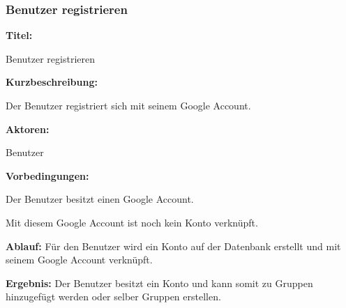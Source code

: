 \documentclass{scrartcl}
\begin{document}
	\subsubsection{Benutzer registrieren}
	\begin{description}
		\item \textbf{Titel:}
		\begin{description}
			\item Benutzer registrieren
		\end{description}
		\item \textbf{Kurzbeschreibung:}
		\begin{description}
			\item Der Benutzer registriert sich mit seinem Google Account.
		\end{description}
		\item \textbf{Aktoren:}
		\begin{description}
			\item Benutzer 
		\end{description}
		\item \textbf{Vorbedingungen:}
		\begin{description}
			\item Der Benutzer besitzt einen Google Account.
			\item Mit diesem Google Account ist noch kein Konto verknüpft.
		\end{description}
		\item \textbf{Ablauf:} \newline Für den Benutzer wird ein Konto auf der Datenbank erstellt und mit seinem Google Account verknüpft.
		\item \textbf{Ergebnis:} \newline Der Benutzer besitzt ein Konto und kann somit zu Gruppen hinzugefügt werden oder selber Gruppen erstellen.
	\end{description}
	
	\newpage
	
\end{document}
